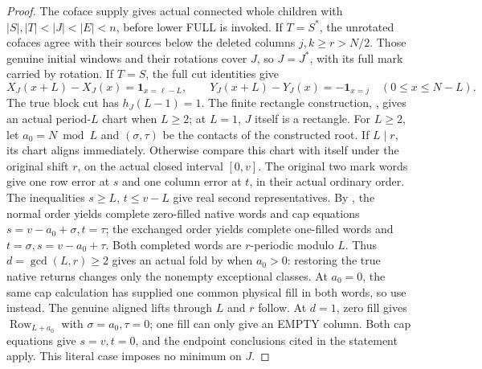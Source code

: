 \documentclass[11pt,a4paper]{amsart}
\numberwithin{equation}{section}
\theoremstyle{plain}
\theoremstyle{definition}
\newcommand{\one}{\mathbf1}
\newcommand{\Row}{\operatorname{Row}}
\begin{document}
\begin{proof}
The coface supply gives actual connected whole children with
\(|S|,|T|<|J|<|E|<n\), before lower FULL is invoked.  If \(T=S^*\),
the unrotated cofaces agree with their sources below the deleted columns
\(j,k\ge r>N/2\).  Those genuine initial windows and their rotations
cover \(J\), so \(J=J^*\), with its full mark carried by rotation.
If \(T=S\), the full cut identities give
\[
 X_J(x+L)-X_J(x)=\one_{x=\ell-L},\qquad
 Y_J(x+L)-Y_J(x)=-\one_{x=j}\quad(0\le x\le N-L).
\]
The true block cut has \(h_J(L-1)=1\).  The finite rectangle
construction, , gives an actual period-\(L\) chart
when \(L\ge2\); at \(L=1\), \(J\) itself is a rectangle.  For
\(L\ge2\), let \(a_0=N\bmod L\) and
\((\sigma,\tau)\) be the contacts of the constructed root.  If
\(L\mid r\), its chart aligns immediately.  Otherwise compare this
chart with itself under the original shift \(r\), on the actual closed
interval \([0,v]\).  The original two mark words give one row error
at \(s\) and one column error at \(t\), in their actual ordinary
order.  The inequalities \(s\ge L\), \(t\le v-L\) give real
second representatives.  By , the normal order
yields complete zero-filled native words and cap equations
\(s=v-a_0+\sigma,t=\tau\); the exchanged order yields complete
one-filled words and \(t=\sigma,s=v-a_0+\tau\).  Both completed
words are \(r\)-periodic modulo \(L\).  Thus
\(d=\gcd(L,r)\ge2\) gives an actual fold by
\cite[Ordinary residue fold]{Shields2026Gluing} when \(a_0>0\):
restoring the true native returns changes only the nonempty exceptional
classes.  At \(a_0=0\), the same cap calculation has supplied one common
physical fill in both words, so use
\cite[Empty residue fold]{Shields2026Gluing} instead.  The genuine
aligned lifts through \(L\) and \(r\) follow.  At \(d=1\), zero fill gives
\(\Row_{L+a_0}\) with \(\sigma=a_0,\tau=0\); one fill can
only give an EMPTY column.  Both cap equations give \(s=v,t=0\),
and the endpoint conclusions cited in the statement apply.
This literal case imposes no minimum on \(J\).


\end{proof}
\end{document}
